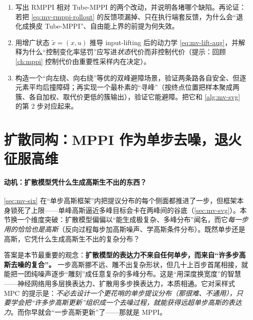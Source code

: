 \begin{practice}
\begin{enumerate}
  \item 写出 RMPPI 相对 Tube-MPPI 的两个改动，并说明各堵哪个缺陷。再论证：若把 \cref{eq:mv-rmppi-rollout} 的反馈项漏掉、只在执行端套反馈，为什么会“退化成换皮 Tube-MPPI”、自由能上界的前提为何失效。
  \item 用增广状态 $\tilde x=(x,u)$ 推导 input-lifting 后的动力学 \cref{eq:mv-lift-aug}，并解释为什么“控制变化率惩罚”应写进\emph{状态}代价而非控制代价（提示：回顾 \cref{ch:mppi} 控制代价由重要性采样内在决定）。
  \item 构造一个“向左绕、向右绕”等优的双峰避障场景，验证两条路各自安全、但逐元素平均后撞障碍；再实现一个最朴素的“寻峰”（按终点位置把样本聚成两簇、各自加权、取代价更低的簇输出），验证它能避障。把它和 \cref{alg:mv-svg} 的第 2 步对应起来。
\end{enumerate}
\end{practice}

\section{扩散同构：MPPI 作为单步去噪，退火征服高维}
\label{sec:mv-diffusion}

\paragraph{动机：扩散模型凭什么生成高斯生不出的东西？}
\cref{sec:mv-six} 在“单步高斯框架”内把提议分布的每个侧面都推进了一步，但框架本身锁死了上限——单峰高斯逼近多峰目标会卡在两峰间的谷底（\cref{sec:mv-svg}）。本节换一个维度突破：扩散模型偏偏以“能生成极复杂、多峰分布”闻名，而它\emph{每一步用的恰恰也是高斯}（反向过程每步加高斯噪声、学高斯条件分布）。既然单步还是高斯，它凭什么生成高斯生不出的复杂分布？

\begin{insight}
答案是本节最重要的观念：\textbf{扩散模型的表达力不来自任何单步，而来自“许多步高斯去噪的复合”。} 一步高斯挪不远、雕不出复杂形状，但几十上百步首尾相接，就能把一团纯噪声逐步“雕刻”成任意复杂的多峰分布。这是“用深度换宽度”的智慧——神经网络用多层换表达力、扩散用多步换表达力，本质相通。它对采样式 MPC 的提示是：\emph{不必去设计一个更花哨的单步提议分布（那很难、不通用），只要学会把“许多步高斯更新”组织成一个去噪过程，就能获得远超单步高斯的表达力}。而你早就会“一步高斯更新”了——那就是 MPPI。
\end{insight}

